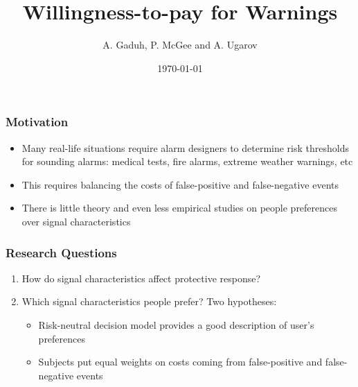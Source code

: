 \documentclass[11pt,hyperref={bookmarks=false}]{beamer}
\title[Willingness-to-pay for Warnings]{Willingness-to-pay for Warnings}
\author[A. Gaduh, P. McGee and A. Ugarov]{A. Gaduh, P. McGee and A. Ugarov}
\institute[]{}
\date{\today}
\begin{document}

\begin{frame}
\titlepage
\end{frame}




\begin{frame}
\frametitle{Motivation}
\begin{itemize}
\item Many real-life situations require alarm designers to determine risk thresholds for sounding alarms: medical tests, fire alarms, extreme weather warnings, etc
\item This requires balancing the costs of false-positive and false-negative events
\item There is little theory and even less empirical studies on people preferences over signal characteristics
\end{itemize}
\end{frame}



\begin{frame}
\frametitle{Research Questions}
\begin{enumerate}
\item How do signal characteristics affect protective response?
\item Which signal characteristics people prefer? Two hypotheses:
\begin{itemize}
\item Risk-neutral decision model provides a good description of user's preferences
\item Subjects put equal weights on costs coming from false-positive and false-negative events
\end{itemize}
\end{enumerate}
\end{frame}
\end{document}
